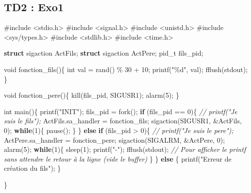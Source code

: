 \documentclass[
]{article}
\author{}
\date{}
\newenvironment{Shaded}{}{}
\newcommand{\CommentTok}[1]{\textcolor[rgb]{0.38,0.63,0.69}{\textit{#1}}}
\newcommand{\ControlFlowTok}[1]{\textcolor[rgb]{0.00,0.44,0.13}{\textbf{#1}}}
\newcommand{\DataTypeTok}[1]{\textcolor[rgb]{0.56,0.13,0.00}{#1}}
\newcommand{\DecValTok}[1]{\textcolor[rgb]{0.25,0.63,0.44}{#1}}
\newcommand{\ImportTok}[1]{#1}
\newcommand{\KeywordTok}[1]{\textcolor[rgb]{0.00,0.44,0.13}{\textbf{#1}}}
\newcommand{\NormalTok}[1]{#1}
\newcommand{\PreprocessorTok}[1]{\textcolor[rgb]{0.74,0.48,0.00}{#1}}
\newcommand{\StringTok}[1]{\textcolor[rgb]{0.25,0.44,0.63}{#1}}
\begin{document}
\hypertarget{td2-exo1}{%
\subsection{TD2 : Exo1}\label{td2-exo1}}

\begin{Shaded}
\begin{Highlighting}[]
\PreprocessorTok{\#include }\ImportTok{\textless{}stdio.h\textgreater{}}
\PreprocessorTok{\#include }\ImportTok{\textless{}signal.h\textgreater{}}
\PreprocessorTok{\#include }\ImportTok{\textless{}unistd.h\textgreater{}}
\PreprocessorTok{\#include }\ImportTok{\textless{}sys/types.h\textgreater{}}
\PreprocessorTok{\#include }\ImportTok{\textless{}stdlib.h\textgreater{}}
\PreprocessorTok{\#include }\ImportTok{\textless{}time.h\textgreater{}}


\KeywordTok{struct}\NormalTok{ sigaction ActFils;}
\KeywordTok{struct}\NormalTok{ sigaction ActPere;}
\NormalTok{pid\_t fils\_pid;}

\DataTypeTok{void}\NormalTok{ fonction\_fils()\{}
    \DataTypeTok{int}\NormalTok{ val = rand() \% }\DecValTok{30}\NormalTok{ + }\DecValTok{10}\NormalTok{;}
\NormalTok{    printf(}\StringTok{"\%d"}\NormalTok{, val);}
\NormalTok{    fflush(stdout);}
\NormalTok{\}}

\DataTypeTok{void}\NormalTok{ fonction\_pere()\{}
\NormalTok{    kill(fils\_pid, SIGUSR1);}
\NormalTok{    alarm(}\DecValTok{5}\NormalTok{);}
\NormalTok{\}}

\DataTypeTok{int}\NormalTok{ main()\{}
\NormalTok{    printf(}\StringTok{"INIT"}\NormalTok{);}
\NormalTok{    fils\_pid = fork();}
    \ControlFlowTok{if}\NormalTok{ (fils\_pid == }\DecValTok{0}\NormalTok{)\{}
        \CommentTok{// printf("Je suis le fils");}
\NormalTok{        ActFils.sa\_handler = fonction\_fils;}
\NormalTok{        sigaction(SIGUSR1, \&ActFils, }\DecValTok{0}\NormalTok{);}
        \ControlFlowTok{while}\NormalTok{(}\DecValTok{1}\NormalTok{)\{}
\NormalTok{            pause();}
\NormalTok{        \}}
\NormalTok{    \} }\ControlFlowTok{else} \ControlFlowTok{if}\NormalTok{ (fils\_pid \textgreater{} }\DecValTok{0}\NormalTok{)\{}
        \CommentTok{// printf("Je suis le pere");}
\NormalTok{        ActPere.sa\_handler = fonction\_pere;}
\NormalTok{        sigaction(SIGALRM, \&ActPere, }\DecValTok{0}\NormalTok{);}
\NormalTok{        alarm(}\DecValTok{5}\NormalTok{);}
        \ControlFlowTok{while}\NormalTok{(}\DecValTok{1}\NormalTok{)\{}
\NormalTok{            sleep(}\DecValTok{1}\NormalTok{);}
\NormalTok{            printf(}\StringTok{"{-}"}\NormalTok{);}
\NormalTok{            fflush(stdout); }\CommentTok{// Pour afficher le printf sans attendre le retour à la ligne (vide le buffer)}
\NormalTok{        \}}
\NormalTok{    \} }\ControlFlowTok{else}\NormalTok{ \{}
\NormalTok{        printf(}\StringTok{"Erreur de création du fils"}\NormalTok{);}
\NormalTok{    \}}

\NormalTok{\}}
\end{Highlighting}
\end{Shaded}
\end{document}
